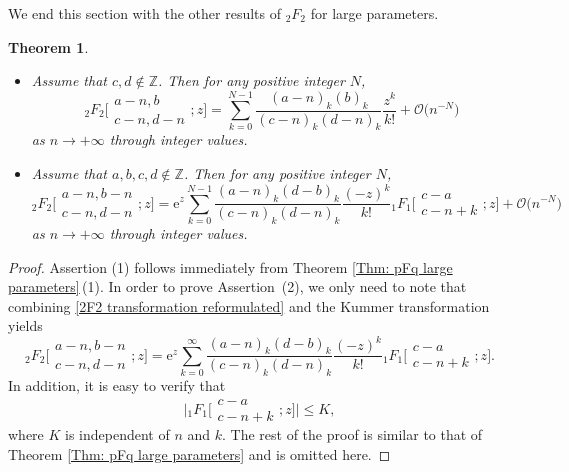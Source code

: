 \documentclass[10pt,a4paper]{amsart}
\numberwithin{equation}{section}
\newtheorem{Theorem}{Theorem}[section]
\newcommand{\ZZ}{\ensuremath{\mathbb{Z}}}
\newcommand{\me}{\mathrm{e}}
\newcommand{\mo}{\mathcal{O}}
\begin{document}
We end this section with the other results of $_2F_2$ for large parameters.

\begin{Theorem}\label{Thm: 2F2 other results}
	~
	\begin{itemize}\itemsep=0pt
		\item[$(1)$] Assume that $c,d\notin\ZZ$. Then for any positive integer $N$,
		\[{}_2F_2\biggl[\begin{matrix}
			a-n,b\\
			c-n,d-n
		\end{matrix};z\biggr]=\sum_{k=0}^{N-1}\frac{(a-n)_k(b)_k}{(c-n)_k(d-n)_k}\frac{z^k}{k!}+\mo\big(n^{-N}\big)\]
		as $n\to +\infty$ through integer values.
		
		\item[$(2)$] Assume that $a,b,c,d\notin\ZZ$. Then for any positive integer $N$,
			\[{}_2F_2\biggl[\begin{matrix}
				a-n,b-n\\
				c-n,d-n
			\end{matrix};z\biggr]=\me^z\sum_{k=0}^{N-1}\frac{(a-n)_k(d-b)_k}{(c-n)_k(d-n)_k}\frac{(-z)^k}{k!}{}_1F_1\biggl[\begin{matrix}
				c-a\\
				c-n+k
			\end{matrix};z\biggr]+\mo\big(n^{-N}\big)\]
			as $n\to +\infty$ through integer values.
	\end{itemize}
\end{Theorem}

\begin{proof}
	Assertion (1) follows immediately from Theorem \ref{Thm: pFq large parameters}\,(1). In order to prove Assertion~(2), we only need to note that combining \eqref{2F2 transformation reformulated} and the Kummer transformation \cite[equation~(13.2.39)]{NIST-Handbook} yields
		\[
		{}_2F_2\biggl[\begin{matrix}
			a-n,b-n\\
			c-n,d-n
		\end{matrix};z\biggr]
		=\mathrm{e}^z\sum_{k=0}^{\infty}\frac{(a-n)_k(d-b)_k}{(c-n)_k(d-n)_k}\frac{(-z)^k}{k!}{}_1F_1\biggl[\begin{matrix}
			c-a\\
			c-n+k
		\end{matrix};z\biggr].
		\]
		In addition, it is easy to verify that
		\[
		\biggl|{}_1F_1\biggl[\begin{matrix}
			c-a\\
			c-n+k
		\end{matrix};z\biggr]\biggr|\leqslant K,
		\]
		where $K$ is independent of $n$ and $k$. The rest of the proof is similar to that of Theorem \ref{Thm: pFq large parameters} and is omitted here.
\end{proof}
\end{document}
